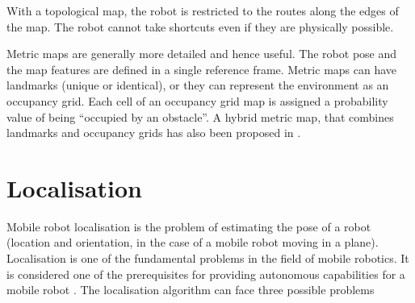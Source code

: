 With a topological map, the robot is restricted to the routes along
the edges of the map. The robot cannot take shortcuts even if they are
physically possible. 


Metric maps are generally more detailed and hence useful. 
The robot pose and the map features are defined in a single
reference frame. Metric maps can have landmarks (unique or identical),
or they can represent the environment as an occupancy grid. Each cell
of an occupancy grid map is assigned a probability value of being
``occupied by an obstacle''. A hybrid metric map, that combines
landmarks and occupancy grids has also been proposed in
\cite{guivant04}.  



\section{Localisation} 
\label{sec:Localisation}


Mobile robot localisation is the problem of estimating the pose of a
robot (location and orientation, in the case of a mobile robot moving
in a plane). Localisation is one of the fundamental problems in the
field of mobile robotics. It is considered one of the prerequisites
for providing autonomous capabilities for a mobile robot \cite{Cox91}.
The localisation algorithm can face three possible problems

